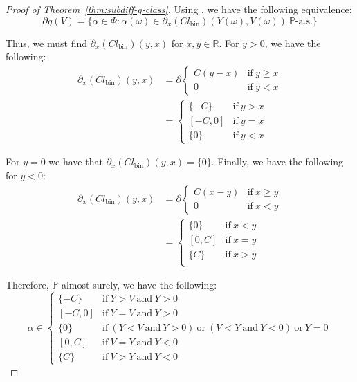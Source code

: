 \documentclass{article}
\begin{document}
\begin{proof}[Proof of Theorem~\ref{thm:subdiff-g-class}]
Using \cite[Theorem 6.5]{bùi2024interchangerulesintegralfunctions}, we have the following equivalence:
\begin{equation} \label{subderiv-as-equiv}
     \partial g (V) = \{\alpha \in \Phi : \alpha(\omega) \in \partial_x(Cl_\text{bin})(Y(\omega),V(\omega)) \ \mathbb{P}\text{-a.s.}\}
\end{equation} 

Thus, we must find $\partial_x(Cl_\text{bin})(y,x)$ for $x,y \in \mathbb{R}$. For $y > 0$, we have the following:
\begin{align}
    \partial_x(Cl_\text{bin})(y,x) & = \partial\begin{cases}
        C (y-x) &\text{if}\ y \ge x\\
        0 &\text{if} \ y<x
    \end{cases}\\
    &= \begin{cases}
        \{-C\} &\text{if} \ y > x \\
        [-C, 0] &\text{if} \ y = x \\
        \{0\} &\text{if} \ y < x
    \end{cases}
\end{align}

For $y = 0$ we have that $\partial_x(Cl_\text{bin})(y,x) = \{0\}$. Finally, we have the following for $y < 0$:
\begin{align}
    \partial_x(Cl_\text{bin})(y,x) & = \partial\begin{cases}
        C (x-y) &\text{if}\ x \ge y\\
        0 &\text{if} \ x<y
    \end{cases}\\
    &= \begin{cases}
        \{0\} &\text{if} \ x < y \\
        [0,C] &\text{if} \ x = y \\
        \{C\} &\text{if} \ x > y \\
    \end{cases}
\end{align}

Therefore, $\mathbb{P}$-almost surely, we have the following:
\begin{equation}
    \alpha \in \begin{cases}
        \{-C\} &\text{if} \ Y > V \ \text{and} \ Y>0 \\
        [-C, 0] &\text{if} \ Y = V \ \text{and} \ Y>0 \\
        \{0\} &\text{if} \ (Y < V \ \text{and} \ Y>0) \ \text{or} \ (V < Y \ \text{and} \ Y<0) \ \text{or} \ Y=0 \\
        [0,C] &\text{if} \ V = Y \ \text{and} \ Y <0 \\
        \{C\} &\text{if} \ V > Y \ \text{and} \ Y <0
    \end{cases}
\end{equation}


\end{proof}
\end{document}
